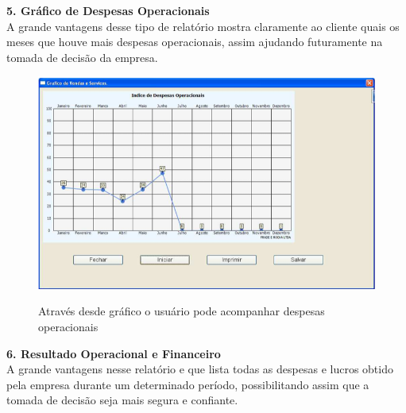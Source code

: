 \documentclass[12pt,openright,twoside,a4paper,english,french,spanish,brazil]{abntex2}
\begin{document}
\textbf{5.	{Gráfico de Despesas Operacionais}}\\
A grande vantagens desse tipo de relatório mostra claramente ao cliente quais os meses que houve mais despesas operacionais, assim ajudando futuramente na tomada de decisão da empresa.

\begin{figure}[htb!]
\includegraphics[scale=0.7]{grafico_despesa_operacional} 
\centering
\caption{Através desde gráfico o usuário pode acompanhar despesas operacionais}
\cite{NetServiceConsultoriaemSistemas2013}
\label{img_grafico_despesa_operacional}
\end{figure}

\newpage
\textbf{6.	{Resultado Operacional e Financeiro}}\\
A grande vantagens nesse relatório e que lista todas as despesas e lucros obtido pela empresa durante um determinado período, possibilitando assim que a tomada de decisão seja mais segura e confiante.
\end{document}
